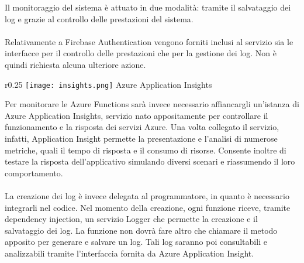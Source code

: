 Il monitoraggio del sistema è attuato in due modalità:
tramite il salvataggio dei log e grazie al controllo delle prestazioni del sistema.\\
\\
Relativamente a Firebase Authentication vengono forniti inclusi al servizio
sia le interfacce per il controllo delle prestazioni che per la gestione dei log.
Non è quindi richiesta alcuna ulteriore azione.\\
\begin{wrapfigure}{r}{0.25\textwidth}
    \centering
    \texttt{[image: insights.png]}
    Azure Application Insights
\end{wrapfigure}
Per monitorare le Azure Functions sarà invece necessario
affiancargli un'istanza di Azure Application Insights,
servizio nato appositamente per controllare il funzionamento e la risposta dei servizi Azure.
Una volta collegato il servizio, infatti,
Application Insight permette la presentazione e l'analisi di numerose metriche,
quali il tempo di risposta e il consumo di risorse.
Consente inoltre di testare la risposta dell'applicativo
simulando diversi scenari e riassumendo il loro comportamento.\\
\\
La creazione dei log è invece delegata al programmatore,
in quanto è necessario integrarli nel codice.
Nel momento della creazione, ogni funzione riceve, tramite dependency injection,
un servizio Logger che permette la creazione e il salvataggio dei log.
La funzione non dovrà fare altro che chiamare il metodo apposito per generare e salvare un log.
Tali log saranno poi consultabili e analizzabili tramite l’interfaccia fornita da Azure Application Insight.\\
\clearpage
